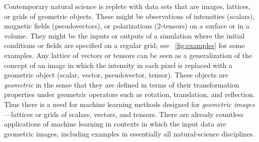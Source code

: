 \documentclass{article}
\theoremstyle{definition}
\newcommand{\figref}[1]{\figurename~\ref{#1}}
\begin{document}
Contemporary natural science is replete with data sets that are images, lattices, or grids of geometric objects.
These might be observations of intensities (scalars), magnetic fields (pseudovectors), or polarizations (2-tensors) on a surface or in a volume.
They might be the inputs or outputs of a simulation where the initial conditions or fields are specified on a regular grid; see \figref{fig:examples} for some examples.
Any lattice of vectors or tensors can be seen as a generalization of the concept of an image in which the intensity in each pixel is replaced with a geometric object (scalar, vector, pseudovector, tensor).
These objects are \emph{geometric} in the sense that they are defined in terms of their transformation properties under geometric operators such as rotation, translation, and reflection.
Thus there is a need for machine learning methods designed for \emph{geometric images}---lattices or grids of scalars, vectors, and tensors.
There are already countless applications of machine learning in contexts in which the input data are geometric images, including examples in essentially all natural-science disciplines.
\end{document}

